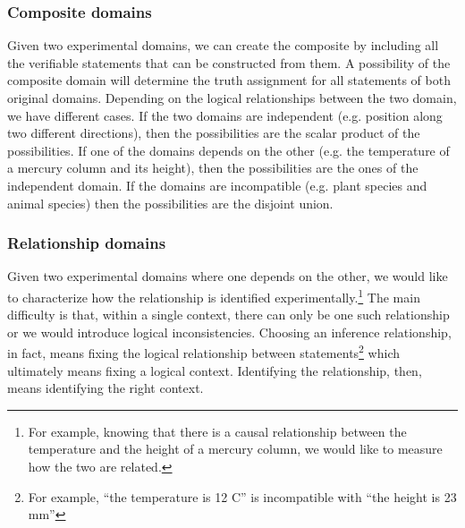 \documentclass[twocolumn]{article}
\newif\ifextended
\newcommand\fact[2]{\ifextended \emph{#1}. #2 \fi}
\begin{document}
\fact{Continuity and inference}{An inference relationship establishes that testing a verifiable statement in one domain tells whether a statement in the other is true or false. As these statements are equivalent, the experimental test on one constitutes an experimental test on the other, which means the second statement is verifiable. One cannot impose an inference relationship between a verifiable and non-verifiable statement. In terms of the natural topology, these correspond to open sets, therefore, by definition, the map is continuous as it maps open sets to open sets. The typical requirement that functions are ``well behaved'', then, is actually physically significant.}


\subsubsection{Composite domains}

Given two experimental domains, we can create the composite by including all the verifiable statements that can be constructed from them. A possibility of the composite domain will determine the truth assignment for all statements of both original domains. Depending on the logical relationships between the two domain, we have different cases. If the two domains are independent (e.g. position along two different directions), then the possibilities are the scalar product of the possibilities. If one of the domains depends on the other (e.g. the temperature of a mercury column and its height), then the possibilities are the ones of the independent domain. If the domains are incompatible (e.g. plant species and animal species) then the possibilities are the disjoint union.


\subsubsection{Relationship domains}

Given two experimental domains where one depends on the other, we would like to characterize how the relationship is identified experimentally.\footnote{For example, knowing that there is a causal relationship between the temperature and the height of a mercury column, we would like to measure how the two are related.} The main difficulty is that, within a single context, there can only be one such relationship or we would introduce logical inconsistencies. Choosing an inference relationship, in fact, means fixing the logical relationship between statements\footnote{For example, ``the temperature is 12 C'' is incompatible with ``the height is 23 mm''} which ultimately means fixing a logical context. Identifying the relationship, then, means identifying the right context.
\end{document}
